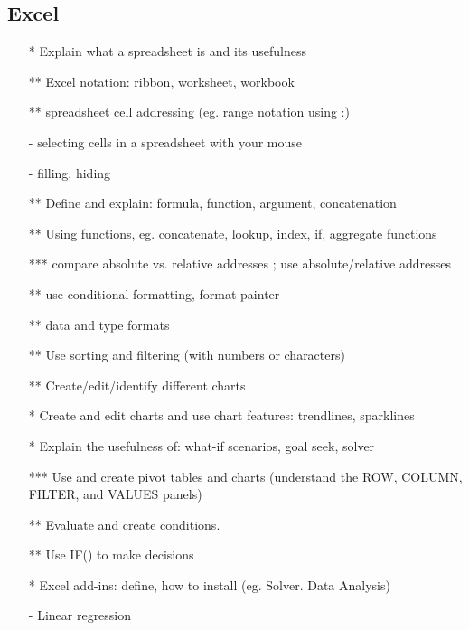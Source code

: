 \documentclass[12pt]{article}%
\begin{document}
\subsection*{Excel}
\begin{itemize}
 \setlength{\itemsep}{1pt}%
    \setlength{\parskip}{1pt}
\item[*] Explain what a spreadsheet is and its usefulness
\item[**] Excel notation: ribbon, worksheet, workbook
\item[**]  spreadsheet cell addressing (eg. range notation using :)
\item[-]  selecting cells in a spreadsheet with your mouse 
\item[-]  filling, hiding
\item[**] Define and explain: formula, function, argument, concatenation
\item[**] Using functions, eg. concatenate, lookup, index, if, aggregate functions
\item[***] compare absolute vs. relative addresses ; use absolute/relative addresses
\item[**] use conditional formatting, format painter
\item[**] data and type formats
\item[**] Use sorting and filtering (with numbers or characters)
\item[**] Create/edit/identify different charts
 \item[*]  Create and edit charts and use chart features: trendlines, sparklines
\item[*] Explain the usefulness of: what-if scenarios, goal seek, solver
\item[***] Use and create pivot tables and charts (understand the ROW, COLUMN, FILTER, and VALUES panels)
\item[**] Evaluate and create conditions. 
\item[**] Use IF() to make decisions
\item[*] Excel add-ins: define, how to install (eg. Solver. Data Analysis)
\item[-] Linear regression
\end{itemize}
\end{document}
